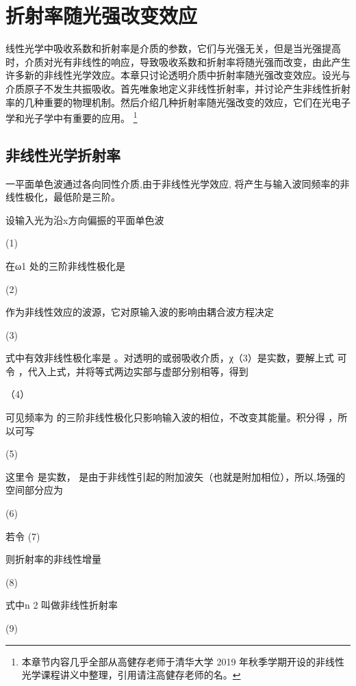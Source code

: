 \section{折射率随光强改变效应}
线性光学中吸收系数和折射率是介质的参数，它们与光强无关，但是当光强提高时，介质对光有非线性的响应，导致吸收系数和折射率将随光强而改变，由此产生许多新的非线性光学效应。本章只讨论透明介质中折射率随光强改变效应。设光与介质原子不发生共振吸收。首先唯象地定义非线性折射率，并讨论产生非线性折射率的几种重要的物理机制。然后介绍几种折射率随光强改变的效应，它们在光电子学和光子学中有重要的应用。
\footnote{本章节内容几乎全部从高健存老师于清华大学 2019 年秋季学期开设的非线性光学课程讲义中整理，引用请注高健存老师的名。}

\subsection{非线性光学折射率}
 一平面单色波通过各向同性介质,由于非线性光学效应, 将产生与输入波同频率的非线性极化，最低阶是三阶。

设输入光为沿x方向偏振的平面单色波

                                  (1)

在ω1 处的三阶非线性极化是

               (2)

作为非线性效应的波源，它对原输入波的影响由耦合波方程决定

                               (3)

式中有效非线性极化率是 。对透明的或弱吸收介质，χ（3）是实数，要解上式 可令 ，代入上式，并将等式两边实部与虚部分别相等，得到

                  （4）
                                                             
可见频率为 的三阶非线性极化只影响输入波的相位，不改变其能量。积分得 ，所以可写

                                      (5)

这里令 是实数， 是由于非线性引起的附加波矢（也就是附加相位），所以,场强的空间部分应为

                                                 (6)

若令                                             (7)

则折射率的非线性增量

                                       (8)

式中n 2  叫做非线性折射率

                                (9)

